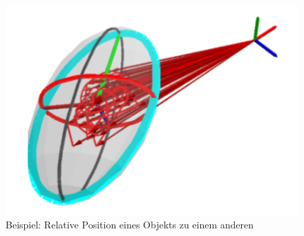 \begin{figure}
	\centering
	\includegraphics[width=15cm]{bilder/relation.pdf}
	\caption{Beispiel: Relative Position eines Objekts zu einem anderen}
	\label{img:relation}
\end{figure}

